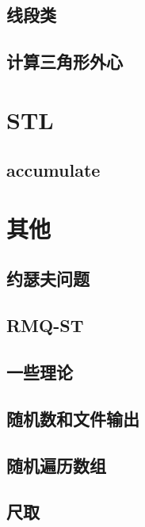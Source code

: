 \documentclass{ctexart}
\begin{document}
\subsection{线段类}

\subsection{计算三角形外心}



\section{STL}
\subsection{accumulate}




\section{其他}
\subsection{约瑟夫问题}

\subsection{RMQ-ST}

\subsection{一些理论}

\subsection{随机数和文件输出}

\subsection{随机遍历数组}

\subsection{尺取}

\end{document}

